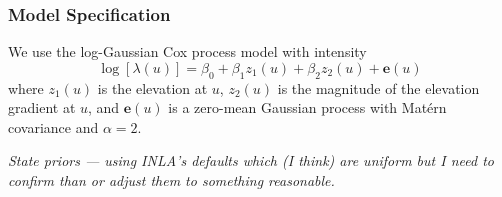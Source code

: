 \documentclass[]{interact}
\begin{document}
\subsubsection{Model Specification}

We use the log-Gaussian Cox process model with intensity
\begin{displaymath}
\log\left[\lambda(u)\right] = \beta_{0} + \beta_{1} z_{1}(u)
+ \beta_{2} z_{2}(u) + \mathbf{e}(u)
\end{displaymath}
where \(z_{1}(u)\) is the elevation at \(u\), \(z_{2}(u)\) is the magnitude of
the elevation gradient at \(u\), and \(\mathbf{e}(u)\) is a zero-mean Gaussian
process with Mat\'{e}rn covariance and \(\alpha = 2\).

{\it State priors --- using INLA's defaults which (I think) are uniform but I
need to confirm than or adjust them to something reasonable.}
\end{document}

